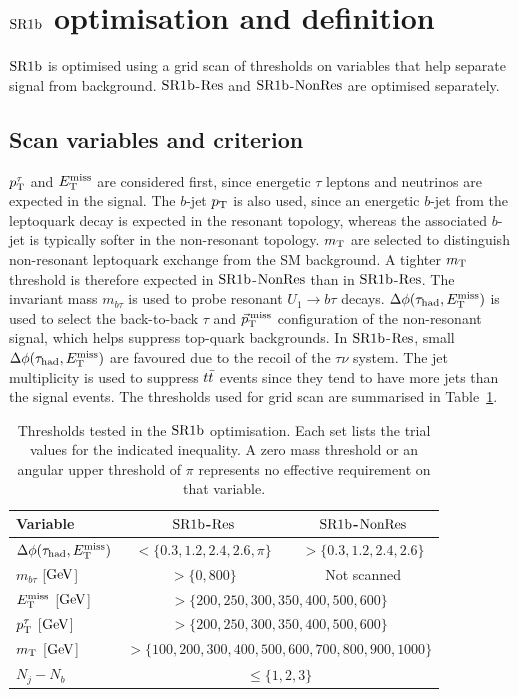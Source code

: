 \section[$\bTagSR$ optimisation and definition]{$\bTagSR$ optimisation and definition}
\label{sec:ch7_sr1b}

$\bTagSR$ is optimised using a grid scan of thresholds on variables that help separate signal from background. $\bTagSR$-$\mathrm{Res}$ and $\bTagSR$-$\mathrm{NonRes}$ are optimised separately.

\subsection{Scan variables and criterion}
\label{subsec:ch7_scan}

$p_{\mathrm{T}}^\tau$ and $E_{\mathrm{T}}^{\mathrm{miss}}$ are considered first, since energetic $\tau$ leptons and neutrinos are expected in the signal.
The $b$-jet $p_{\mathrm{T}}$ is also used, since an energetic $b$-jet from the leptoquark decay is expected in the resonant topology, whereas the associated $b$-jet is typically softer in the non-resonant topology.
$m_{\mathrm{T}}$ are selected to distinguish non-resonant leptoquark exchange from the SM background.
A tighter $m_{\mathrm{T}}$ threshold is therefore expected in $\bTagSR$-$\mathrm{NonRes}$ than in $\bTagSR$-$\mathrm{Res}$.
The invariant mass $m_{b\tau}$ is used to probe resonant $U_1\to b\tau$ decays.
$\Delta\phi(\tau_{\mathrm{had}}, E_{\mathrm{T}}^{\mathrm{miss}})$ is used to select the back-to-back $\tau$ and $\vec p_{\mathrm{T}}^{\,\mathrm{miss}}$ configuration of the non-resonant signal, which helps suppress top-quark backgrounds.
In $\bTagSR$-$\mathrm{Res}$, small $\Delta\phi(\tau_{\mathrm{had}}, E_{\mathrm{T}}^{\mathrm{miss}})$ are favoured due to the recoil of the $\tau\nu$ system.
The jet multiplicity is used to suppress $t\bar{t}$ events since they tend to have more jets than the signal events.
The thresholds used for grid scan are summarised in Table~\ref{tab:ch7_scan_variables}.

\begin{table}[htbp]
    \centering
    \small
    \caption{Thresholds tested in the $\bTagSR$ optimisation. Each set lists the trial values for the indicated inequality. A zero mass threshold or an angular upper threshold of $\pi$ represents no effective requirement on that variable.}
    \label{tab:ch7_scan_variables}
    \begin{tabular}{lcc}
        \toprule
        Variable & $\bTagSR$-$\mathrm{Res}$ & $\bTagSR$-$\mathrm{NonRes}$ \\
        \midrule
        $\Delta\phi(\tau_{\mathrm{had}}, E_{\mathrm{T}}^{\mathrm{miss}})$ & $<\{0.3,1.2,2.4,2.6,\pi\}$ & $>\{0.3,1.2,2.4,2.6\}$ \\
        $m_{b\tau}$ [$\mathrm{GeV}$] & $>\{0,800\}$ & Not scanned \\
        $E_{\mathrm{T}}^{\mathrm{miss}}$ [$\mathrm{GeV}$] & \multicolumn{2}{c}{$>\{200,250,300,350,400,500,600\}$} \\
        $p_{\mathrm{T}}^\tau$ [$\mathrm{GeV}$] & \multicolumn{2}{c}{$>\{200,250,300,350,400,500,600\}$} \\
        $m_{\mathrm{T}}$ [$\mathrm{GeV}$] & \multicolumn{2}{c}{$>\{100,200,300,400,500,600,700,800,900,1000\}$} \\
        $N_j-N_b$ & \multicolumn{2}{c}{$\leq\{1,2,3\}$} \\
        \bottomrule
    \end{tabular}
\end{table}

